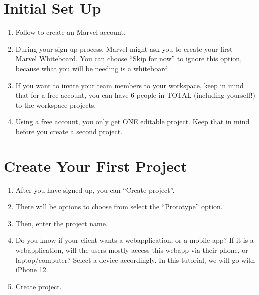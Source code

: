 \documentclass[letterpaper,10pt,english]{jupyterBook}
\begin{document}
\section{Initial Set Up}
\label{\detokenize{appendices/appendix_e/marvel_guide:initial-set-up}}\begin{enumerate}
%
\item {} 
\sphinxAtStartPar
Follow  to create an Marvel account.

\item {} 
\sphinxAtStartPar
During your sign up process, Marvel might ask you to create your first Marvel Whiteboard. You can choose “Skip for now” to ignore this option, because what you will be needing is  a whiteboard.

\item {} 
\sphinxAtStartPar
If you want to invite your team members to your workspace, keep in mind that for a free account, you can have 6 people in TOTAL (including yourself!) to  the workspace projects.

\item {} 
\sphinxAtStartPar
Using a free account, you only get ONE editable project. Keep that in mind before you create a second project.

\end{enumerate}


\section{Create Your First Project}
\label{\detokenize{appendices/appendix_e/marvel_guide:create-your-first-project}}\begin{enumerate}
%
\item {} 
\sphinxAtStartPar
After you have signed up, you can “Create project”.

\item {} 
\sphinxAtStartPar
There will be options to choose from \sphinxhyphen{} select the “Prototype” option.

\item {} 
\sphinxAtStartPar
Then, enter the project name.

\item {} 
\sphinxAtStartPar
Do you know if your client wants a web\sphinxhyphen{}application, or a mobile app? If it is a web\sphinxhyphen{}application, will the users mostly access this web\sphinxhyphen{}app via their phone, or laptop/computer? Select a device accordingly. In this tutorial, we will go with iPhone 12. 

\item {} 
\sphinxAtStartPar
Create project.

\end{enumerate}
\end{document}
